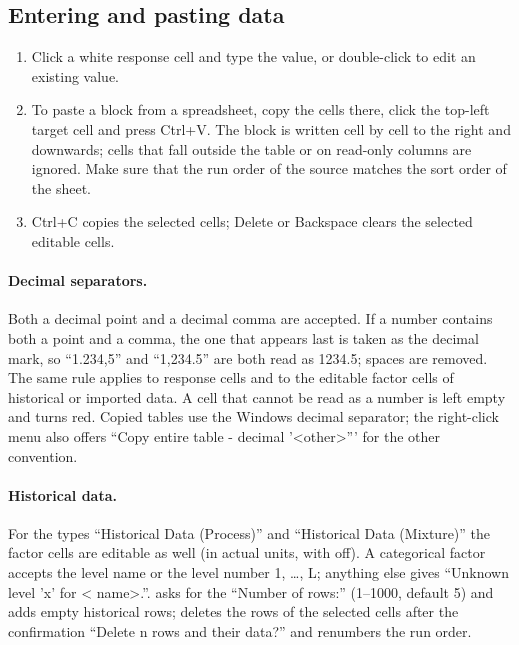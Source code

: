 \subsection{Entering and pasting data}
\label{sec:ch04-entering}
\begin{enumerate}
\item Click a white response cell and type the value, or double-click to edit an existing value.
\item To paste a block from a spreadsheet, copy the cells there, click the top-left target cell and press Ctrl+V.
The block is written cell by cell to the right and downwards; cells that fall outside the table or on read-only
columns are ignored. Make sure that the run order of the source matches the sort order of the sheet.
\item Ctrl+C copies the selected cells; Delete or Backspace clears the selected editable cells.
\end{enumerate}

\paragraph{Decimal separators.} Both a decimal point and a decimal comma are accepted. If a number contains both a
point and a comma, the one that appears last is taken as the decimal mark, so ``1.234,5'' and ``1,234.5'' are both
read as 1234.5; spaces are removed. The same rule applies to response cells and to the editable factor cells of
historical or imported data. A cell that cannot be read as a number is left empty and turns red. Copied
tables use the Windows decimal separator; the right-click menu also offers ``Copy entire table - decimal
'\textless other\textgreater''' for the other convention.

\paragraph{Historical data.} For the types ``Historical Data (Process)'' and ``Historical Data (Mixture)'' the
factor cells are editable as well (in actual units, with  off). A categorical factor accepts
the level name or the level number 1, \dots, L; anything else gives ``Unknown level 'x' for \textless
name\textgreater.''.  asks for the ``Number of rows:'' (1--1000, default 5) and adds empty historical
rows;  deletes the rows of the selected cells after the confirmation ``Delete n rows and
their data?'' and renumbers the run order.

